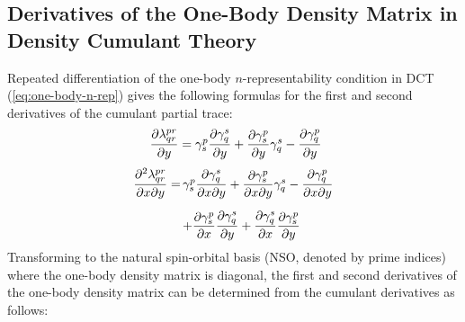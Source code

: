 \begin{subappendices}
    \section{%
        Derivatives of the One-Body Density Matrix in Density Cumulant Theory
    }
    \label{sec:appendix}

    Repeated differentiation of the one-body \(n\)-representability condition in
    DCT (\cref{eq:one-body-n-rep}) gives the following formulas for the first
    and second derivatives of the cumulant partial trace:
    \begin{equation}
        \begin{array}{r@{\,}l}
            \dfrac{\partial \lambda^{pr}_{qr}}{\partial{y}}
            =
            \gamma^p_s
            \dfrac{\partial \gamma^s_q}{\partial{y}}
            +
            \dfrac{\partial \gamma^p_s}{\partial{y}}
            \gamma^s_q
            -
            \dfrac{\partial \gamma^p_q}{\partial{y}}
        \end{array}
    \end{equation}
    \begin{equation}
        \begin{array}{r@{\,}l}
            \dfrac{\partial^2 \lambda^{pr}_{qr}}{%
                \partial{x}
                \partial{y}
            }
            =
            &
            \gamma^p_s
            \dfrac{\partial \gamma^s_q}{%
                \partial{x}
                \partial{y}
            }
            +
            \dfrac{\partial \gamma^p_s}{%
                \partial{x} \partial{y}
            }
            \gamma^s_q
            -
            \dfrac{\partial \gamma^p_q}{%
                \partial{x}
                \partial{y}
            }
            \\[15pt]
            &
            +
            \dfrac{\partial \gamma^p_s}{\partial{x}}
            \dfrac{\partial \gamma^s_q}{\partial{y}}
            +
            \dfrac{\partial \gamma^s_q}{\partial{x}}
            \dfrac{\partial \gamma^p_s}{\partial{y}}
        \end{array}
    \end{equation}
    Transforming to the natural spin-orbital basis (NSO, denoted by prime
    indices) where the one-body density matrix is diagonal, the first and second
    derivatives of the one-body density matrix can be determined from the
    cumulant derivatives as follows:
    \begin{equation}
        \label{eq:one-body-n-rep-gradient}

\end{equation}
\end{subappendices}
